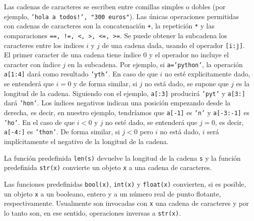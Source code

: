 \documentclass[a4paper, 11pt]{article}
\theoremstyle{plain}
\theoremstyle{definition}
\begin{document}
\bigskip



\bigskip

Las cadenas de caracteres se escriben entre comillas simples o dobles (por
ejemplo, \texttt{'hola a todos!', "300 euros"}). Las únicas operaciones
permitidas con cadenas de caracteres son la concatenación \texttt{+}, la
repetición \texttt{*} y las comparaciones \texttt{==, !=, <, >, <=, >=}.
Se puede obtener la subcadena los caracteres entre los indices $i$ y
$j$ de una cadena dada, usando el operador \texttt{[i:j]}.
El primer caracter de una cadena tiene índice $0$ y el operador no incluye
el caracter con índice $j$ en la subcadena. Por ejemplo, si \texttt{a='python'},
la operación \texttt{a[1:4]} dará como resultado \texttt{'yth'}. En caso
de que $i$ no esté explicitamente dado, se entenderá que $i=0$ y de forma
similar, si $j$ no está dado, se supone que $j$ es la longitud de la cadena.
Siguiendo con el ejemplo, \texttt{a[:3]} producirá \texttt{'pyt'} y \texttt{a[3:]}
dará \texttt{'hon'}. Los índices negativos indican una posición empezando desde
la derecha, es decir, en nuestro ejemplo, tendríamos que \texttt{a[-1]} es
\texttt{'n'} y \texttt{a[-3:-1]} es \texttt{'ho'}. En el caso de que $i<0$ y $j$
no esté dado, se entenderá que $j=0$, es decir, \texttt{a[-4:]} es \texttt{'thon'}.
De forma similar, si $j<0$ pero $i$ no está dado, $i$ será implícitamente
el negativo de la longitud de la cadena.

\bigskip

La función predefinida
\texttt{len(s)} devuelve la longitud de la cadena \texttt{s} y la función
predefinida \texttt{str(x)} convierte un objeto \texttt{x} a una cadena de
caracteres.

\bigskip



\bigskip

Las funciones predefinidas \texttt{bool(x)}, \texttt{int(x)} y \texttt{float(x)}
convierten, si es posible, un objeto \texttt{x} a un booleano, entero y a un
número real de punto flotante, respectivamente. Usualmente son invocadas con
\texttt{x} una cadena de caracteres y por lo tanto son, en ese sentido,
operaciones inversas a \texttt{str(x)}.

\bigskip
\end{document}
